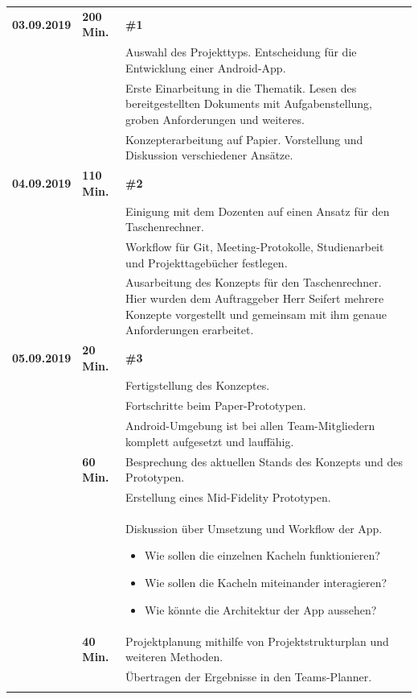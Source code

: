 {\begin{longtable}{|l|l|p{11cm}|}
		\textbf{03.09.2019} & \textbf{200 Min.} &
			\textbf{\#1}
			\\ & &
			Auswahl des Projekttyps. Entscheidung für die Entwicklung einer Android-App.
			\\ & &
			Erste Einarbeitung in die Thematik. Lesen des bereitgestellten Dokuments mit Aufgabenstellung, groben Anforderungen und weiteres. 
			\\ & &
			Konzepterarbeitung auf Papier. Vorstellung und Diskussion verschiedener Ansätze.
	\\\hline
		\textbf{04.09.2019} & \textbf{110 Min.} &
			\textbf{\#2}
			\\ & &
			Einigung mit dem Dozenten auf einen Ansatz für den Taschenrechner.
			\\ & &
			Workflow für Git, Meeting-Protokolle, Studienarbeit und Projekttagebücher festlegen.
			\\ & &
			Ausarbeitung des Konzepts für den Taschenrechner. Hier wurden dem Auftraggeber Herr Seifert mehrere Konzepte vorgestellt und gemeinsam mit ihm genaue Anforderungen erarbeitet.
	\\\hline
		\textbf{05.09.2019} & \textbf{20 Min.} &
			\textbf{\#3}
			\\ & &
			Fertigstellung des Konzeptes.
			\\ & &
			Fortschritte beim Paper-Prototypen.
			\\ & &
			Android-Umgebung ist bei allen Team-Mitgliedern komplett aufgesetzt und lauffähig.
	\\ \cline{2-3}
		& \textbf{60 Min.} &
			Besprechung des aktuellen Stands des Konzepts und des Prototypen.
			\\ & &
			Erstellung eines Mid-Fidelity Prototypen.
			\\ & &
			Diskussion über Umsetzung und Workflow der App.
			\begin{itemize}\renewcommand\labelitemi{--}
				\item  Wie sollen die einzelnen Kacheln funktionieren?
				\item Wie sollen die Kacheln miteinander interagieren?
				\item Wie könnte die Architektur der App aussehen?
			\end{itemize}
	\\ \cline{2-3}
		& \textbf{40 Min.} &
			Projektplanung mithilfe von Projektstrukturplan und weiteren Methoden.
			\\ & &
			Übertragen der Ergebnisse in den Teams-Planner.
			\\ & &

\end{longtable}}
